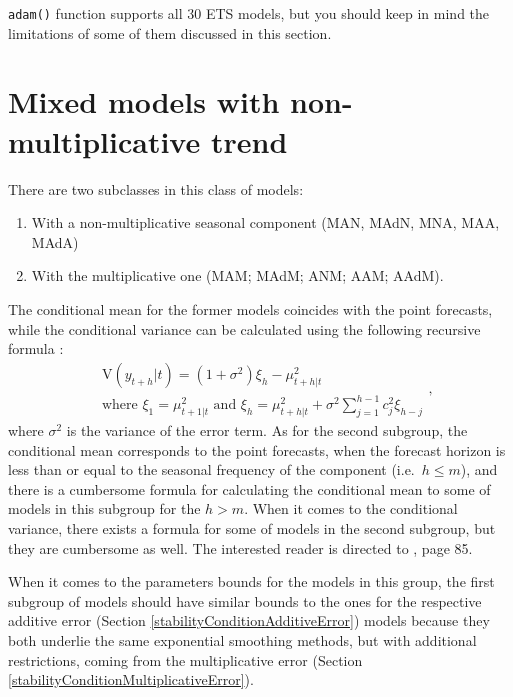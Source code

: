\documentclass[]{book}
\providecommand{\tightlist}{%
  \setlength{\itemsep}{0pt}\setlength{\parskip}{0pt}}
\theoremstyle{definition}
\theoremstyle{definition}
\theoremstyle{definition}
\theoremstyle{definition}
\theoremstyle{remark}
\begin{document}
\texttt{adam()} function supports all 30 ETS models, but you should keep in mind the limitations of some of them discussed in this section.

\hypertarget{ADAMETSMixedModelsGroup3}{%
\section{Mixed models with non-multiplicative trend}\label{ADAMETSMixedModelsGroup3}}

There are two subclasses in this class of models:

\begin{enumerate}
\def\labelenumi{\arabic{enumi}.}
\tightlist
\item
  With a non-multiplicative seasonal component (MAN, MAdN, MNA, MAA, MAdA)
\item
  With the multiplicative one (MAM; MAdM; ANM; AAM; AAdM).
\end{enumerate}

The conditional mean for the former models coincides with the point forecasts, while the conditional variance can be calculated using the following recursive formula \citep[page 84]{Hyndman2008b}:
\begin{equation}
    \begin{aligned}
    & \mathrm{V}(y_{t+h}|t) = (1+\sigma^2) \xi_h -\mu_{t+h|t}^2 \\
    & \text{where } \xi_{1} = \mu_{t+1|t}^2 \text{ and } \xi_h = \mu_{t+h|t}^2 + \sigma^2 \sum_{j=1}^{h-1} c_{j}^2 \xi_{h-j}
    \end{aligned} ,
    \label{eq:ETSADAMMixedModels31Variance}
\end{equation}
where \(\sigma^2\) is the variance of the error term. As for the second subgroup, the conditional mean corresponds to the point forecasts, when the forecast horizon is less than or equal to the seasonal frequency of the component (i.e.~\(h\leq m\)), and there is a cumbersome formula for calculating the conditional mean to some of models in this subgroup for the \(h>m\). When it comes to the conditional variance, there exists a formula for some of models in the second subgroup, but they are cumbersome as well. The interested reader is directed to \citet{Hyndman2008b}, page 85.

When it comes to the parameters bounds for the models in this group, the first subgroup of models should have similar bounds to the ones for the respective additive error (Section \ref{stabilityConditionAdditiveError}) models because they both underlie the same exponential smoothing methods, but with additional restrictions, coming from the multiplicative error (Section \ref{stabilityConditionMultiplicativeError}).
\end{document}
